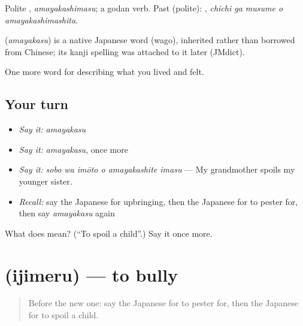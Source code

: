 Polite \textbf{}, \emph{amayakashimasu}; a godan verb. Past (polite): \textbf{  }, \emph{chichi ga musume o amayakashimashita}.

\begin{cousinweb}
\textbf{} (\emph{amayakasu}) is a native Japanese word (wago), inherited rather than borrowed from Chinese; its kanji spelling was attached to it later (JMdict).
\end{cousinweb}

\begin{grammarlens}[title={What you've built}]
One more word for describing what you lived and felt.
\end{grammarlens}

\subsection*{Your turn}
\begin{itemize}
\raggedright
  \item \emph{Say it:} \emph{amayakasu}
  \item \emph{Say it:} \emph{amayakasu}, once more
  \item \emph{Say it:} \emph{sobo wa imōto o amayakashite imasu} — My grandmother spoils my younger sister.
  \item \emph{Recall:} say the Japanese for upbringing, then the Japanese for to pester for, then say \emph{amayakasu} again
\end{itemize}

\begin{tcolorbox}[breakable,colback=teal!4,colframe=teal!35!black,title={Before you move on}]
What does  mean? (\textquotedblleft{}To spoil a child\textquotedblright{}.) Say it once more.
\end{tcolorbox}
\section[\texorpdfstring{\ja{いじめる} (ijimeru)}{いじめる (ijimeru)}]{ (ijimeru) — to bully}

\label{lesson:JA-C478-ijimeru}



\begin{quote}
Before the new one: say the Japanese for to pester for, then the Japanese for to spoil a child.
\end{quote}

